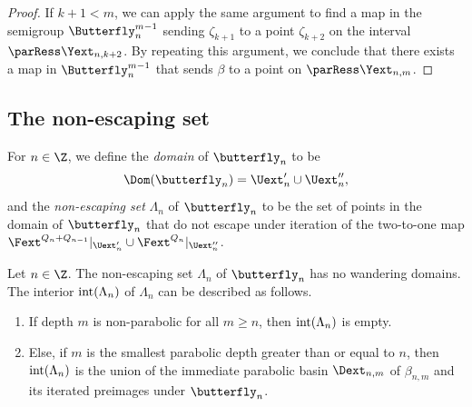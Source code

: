 \documentclass{amsart}
\begin{document}
\begin{proof}
    If $k+1 < m$, we can apply the same argument to find a map in the semigroup $\Butterfly_n^{m-1}$ sending $\zeta_{k+1}$ to a point $\zeta_{k+2}$ on the interval $\parRess \Yext_{n,k+2}$. By repeating this argument, we conclude that there exists a map in $\Butterfly_n^{m-1}$ that sends $\beta$ to a point on $\parRess \Yext_{n,m}$.
\end{proof}

\subsection{The non-escaping set}
\label{ss:non-esc-set-butterfly}

\begin{definition}
    For $n \in \Z$, we define the \emph{domain} of $\butterfly_n$ to be
\[
    \Dom(\butterfly_n) = \Uext'_n \cup \Uext''_n,
\]
    and the \emph{non-escaping set} $\Lambda_n$ of $\butterfly_n$ to be the set of points in the domain of $\butterfly_n$ that do not escape under iteration of the two-to-one map $\Fext^{Q_n+Q_{n-1}}|_{\Uext'_n} \cup \Fext^{Q_n}|_{\Uext''_n}$. 
\end{definition}

\begin{lemma}
\label{lem:nowhere-dense}
    Let $n \in \Z$. The non-escaping set $\Lambda_n$ of $\butterfly_n$ has no wandering domains. The interior $\textnormal{int}(\Lambda_n)$ of $\Lambda_n$ can be described as follows.
    \begin{enumerate}
        \item If depth $m$ is non-parabolic for all $m \geq n$, then $\textnormal{int}(\Lambda_n)$ is empty.
        \item Else, if $m$ is the smallest parabolic depth greater than or equal to $n$, then $\textnormal{int}(\Lambda_n)$ is the union of the immediate parabolic basin $\Dext_{n,m}$ of $\beta_{n,m}$ and its iterated preimages under $\butterfly_n$.
    \end{enumerate}
\end{lemma}
\end{document}
